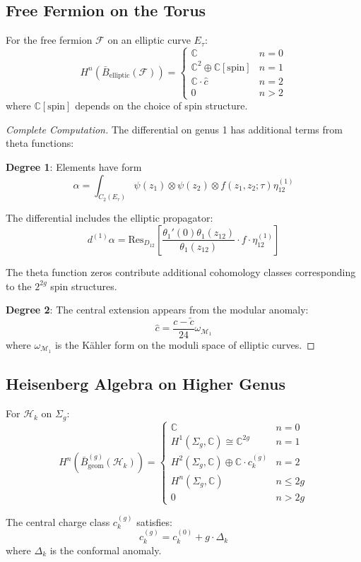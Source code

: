 \subsection{Free Fermion on the Torus}

\begin{theorem}
For the free fermion $\mathcal{F}$ on an elliptic curve $E_\tau$:
\[
H^n(\bar{B}_{\text{elliptic}}(\mathcal{F})) = \begin{cases}
\mathbb{C} & n = 0 \\
\mathbb{C}^2 \oplus \mathbb{C}[\text{spin}] & n = 1 \\
\mathbb{C} \cdot \hat{c} & n = 2 \\
0 & n > 2
\end{cases}
\]
where $\mathbb{C}[\text{spin}]$ depends on the choice of spin structure.
\end{theorem}

\begin{proof}[Complete Computation]
The differential on genus 1 has additional terms from theta functions:

\textbf{Degree 1}: Elements have form
\[
\alpha = \int_{C_2(E_\tau)} \psi(z_1) \otimes \psi(z_2) \otimes f(z_1, z_2; \tau)\eta_{12}^{(1)}
\]

The differential includes the elliptic propagator:
\[
d^{(1)}\alpha = \text{Res}_{D_{12}}\left[\frac{\theta_1'(0)\theta_1(z_{12})}{\theta_1(z_{12})} \cdot f \cdot \eta_{12}^{(1)}\right]
\]

The theta function zeros contribute additional cohomology classes corresponding to the $2^{2g}$ spin structures.

\textbf{Degree 2}: The central extension appears from the modular anomaly:
\[
\hat{c} = \frac{c - \tilde{c}}{24}\omega_{\mathcal{M}_1}
\]
where $\omega_{\mathcal{M}_1}$ is the Kähler form on the moduli space of elliptic curves.
\end{proof}

\subsection{Heisenberg Algebra on Higher Genus}

\begin{theorem}
For $\mathcal{H}_k$ on $\Sigma_g$:
\[
H^n(\bar{B}_{\text{geom}}^{(g)}(\mathcal{H}_k)) = \begin{cases}
\mathbb{C} & n = 0 \\
H^1(\Sigma_g, \mathbb{C}) \cong \mathbb{C}^{2g} & n = 1 \\
H^2(\Sigma_g, \mathbb{C}) \oplus \mathbb{C} \cdot c_k^{(g)} & n = 2 \\
H^n(\Sigma_g, \mathbb{C}) & n \leq 2g \\
0 & n > 2g
\end{cases}
\]

The central charge class $c_k^{(g)}$ satisfies:
\[
c_k^{(g)} = c_k^{(0)} + g \cdot \Delta_k
\]
where $\Delta_k$ is the conformal anomaly.
\end{theorem}

